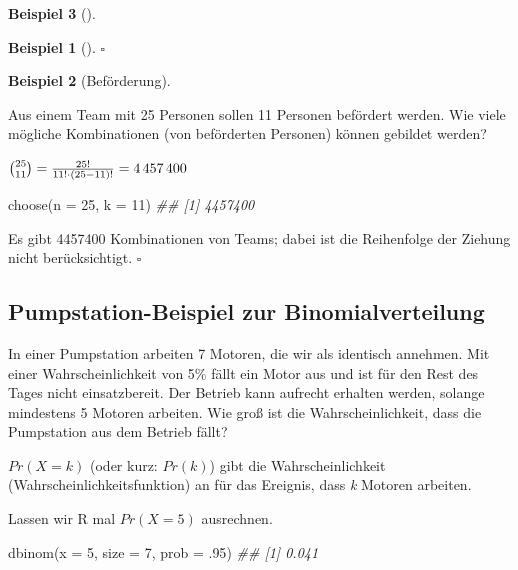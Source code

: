 \documentclass[
  ngerman,
  letterpaper,
  twoside,
  open=any]{scrbook}
\newenvironment{Shaded}{\begin{snugshade}}{\end{snugshade}}
\newcommand{\AttributeTok}[1]{\textcolor[rgb]{0.40,0.45,0.13}{#1}}
\newcommand{\DecValTok}[1]{\textcolor[rgb]{0.68,0.00,0.00}{#1}}
\newcommand{\DocumentationTok}[1]{\textcolor[rgb]{0.37,0.37,0.37}{\textit{#1}}}
\newcommand{\FunctionTok}[1]{\textcolor[rgb]{0.28,0.35,0.67}{#1}}
\newcommand{\NormalTok}[1]{\textcolor[rgb]{0.00,0.23,0.31}{#1}}
\theoremstyle{definition}
\newtheorem{example}{Beispiel}[chapter]
\theoremstyle{plain}
\theoremstyle{definition}
\theoremstyle{definition}
\theoremstyle{remark}
\begin{document}
\begin{example}[]
\begin{example}[]
\(\square\)

\end{example}

\begin{example}[Beförderung]\protect\hypertarget{exm-befördern}{}\label{exm-befördern}

Aus einem Team mit 25 Personen sollen 11 Personen befördert werden. Wie
viele mögliche Kombinationen (von beförderten Personen) können gebildet
werden?

\(\tbinom{25}{11} = \frac{25!}{11!\cdot(25-11)!} = 4\,457\,400\)

\begin{Shaded}
\begin{Highlighting}[]
\FunctionTok{choose}\NormalTok{(}\AttributeTok{n =} \DecValTok{25}\NormalTok{, }\AttributeTok{k =} \DecValTok{11}\NormalTok{)}
\DocumentationTok{\#\# [1] 4457400}
\end{Highlighting}
\end{Shaded}

Es gibt 4457400 Kombinationen von Teams; dabei ist die Reihenfolge der
Ziehung nicht berücksichtigt. \(\square\)

\end{example}

\subsection{Pumpstation-Beispiel zur
Binomialverteilung}\label{pumpstation-beispiel-zur-binomialverteilung}

In einer Pumpstation arbeiten 7 Motoren, die wir als identisch annehmen.
Mit einer Wahrscheinlichkeit von 5\% fällt ein Motor aus und ist für den
Rest des Tages nicht einsatzbereit. Der Betrieb kann aufrecht erhalten
werden, solange mindestens 5 Motoren arbeiten. Wie groß ist die
Wahrscheinlichkeit, dass die Pumpstation aus dem Betrieb fällt?

\(Pr(X=k)\) (oder kurz: \(Pr(k)\)) gibt die Wahrscheinlichkeit
(Wahrscheinlichkeitsfunktion) an für das Ereignis, dass \emph{k} Motoren
arbeiten.

Lassen wir R mal \(Pr(X=5)\) ausrechnen.

\begin{Shaded}
\begin{Highlighting}[]
\FunctionTok{dbinom}\NormalTok{(}\AttributeTok{x =} \DecValTok{5}\NormalTok{, }\AttributeTok{size =} \DecValTok{7}\NormalTok{, }\AttributeTok{prob =}\NormalTok{ .}\DecValTok{95}\NormalTok{)}
\DocumentationTok{\#\# [1] 0.041}
\end{Highlighting}
\end{Shaded}


\end{example}
\end{document}
